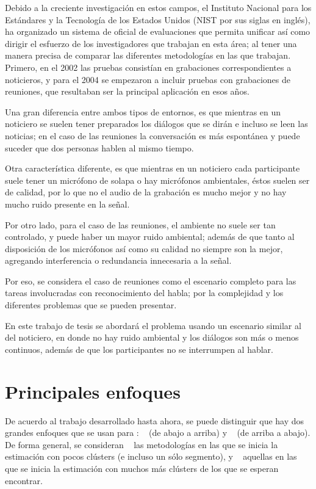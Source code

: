 Debido a la creciente investigación en estos campos, el Instituto Nacional para los Estándares y la Tecnología de los Estados Unidos (NIST por sus siglas en inglés), ha organizado un sistema de oficial de evaluaciones que permita  unificar así como dirigir el esfuerzo de los investigadores que trabajan en esta área; al tener una manera precisa de comparar las diferentes metodologías en las que trabajan. Primero, en el 2002 las pruebas consistían en grabaciones correspondientes a noticieros, y para el 2004 se empezaron a incluir pruebas con grabaciones de reuniones, que resultaban ser la principal aplicación en esos años.

Una gran diferencia entre ambos tipos de entornos, es que mientras en un noticiero se suelen tener preparados los diálogos que se dirán e incluso se leen las noticias; en el caso de las reuniones la conversación es más espontánea y puede suceder que dos personas hablen al mismo tiempo. 

Otra característica diferente, es que mientras en un noticiero cada participante suele tener un micrófono de solapa o hay micrófonos ambientales, éstos suelen ser de calidad, por lo que no el audio de la grabación es mucho mejor y no hay mucho ruido presente en la señal. 

Por otro lado, para el caso de las reuniones, el ambiente no suele ser tan controlado, y puede haber un mayor ruido ambiental; además de que tanto al disposición de los micrófonos así como su calidad no siempre son la mejor, agregando interferencia o redundancia innecesaria a la señal.

Por eso, se considera el caso de reuniones como el escenario completo para las tareas involucradas con reconocimiento del habla; por la complejidad y los diferentes problemas que se pueden presentar.

En este trabajo de tesis se abordará el problema usando un escenario similar al del noticiero, en donde no hay ruido ambiental y los diálogos son más o menos continuos, además de que los participantes no se interrumpen al hablar.

\section{Principales enfoques}
\label{sec:previo}

De acuerdo al trabajo desarrollado hasta ahora, se puede distinguir que hay dos grandes enfoques que se usan para \sd: \bu~ (de abajo a arriba) y \td~ (de arriba a abajo). De forma general, se consideran \bu~ las metodologías en las que se inicia la estimación con pocos clústers (e incluso un sólo segmento), y \td~ aquellas en las que se inicia la estimación con muchos más clústers de los que se esperan encontrar.

